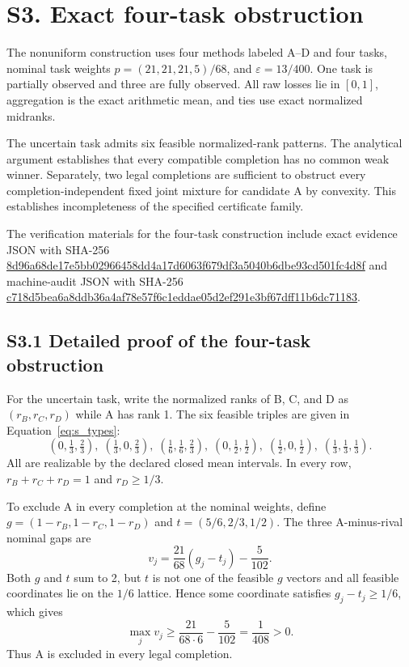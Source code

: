\documentclass[11pt]{article}
\begin{document}
\section*{S3. Exact four-task obstruction}
The nonuniform construction uses four methods labeled A--D and four tasks, nominal task weights $p=(21,21,21,5)/68$, and $\varepsilon=13/400$. One task is partially observed and three are fully observed. All raw losses lie in $[0,1]$, aggregation is the exact arithmetic mean, and ties use exact normalized midranks.

The uncertain task admits six feasible normalized-rank patterns. The analytical argument establishes that every compatible completion has no common weak winner. Separately, two legal completions are sufficient to obstruct every completion-independent fixed joint mixture for candidate A by convexity. This establishes incompleteness of the specified certificate family.

The verification materials for the four-task construction include exact evidence JSON with SHA-256 \url{8d96a68de17e5bb02966458dd4a17d6063f679df3a5040b6dbe93cd501fc4d8f} and machine-audit JSON with SHA-256 \url{c718d5bea6a8ddb36a4af78e57f6c1eddae05d2ef291e3bf67dff11b6dc71183}.

\subsection*{S3.1 Detailed proof of the four-task obstruction}
For the uncertain task, write the normalized ranks of B, C, and D as $(r_B,r_C,r_D)$ while A has rank 1. The six feasible triples are given in Equation~\eqref{eq:s_types}:
\begin{equation}\label{eq:s_types}
(0,\tfrac13,\tfrac23),\;(\tfrac13,0,\tfrac23),\;(\tfrac16,\tfrac16,\tfrac23),\;(0,\tfrac12,\tfrac12),\;(\tfrac12,0,\tfrac12),\;(\tfrac13,\tfrac13,\tfrac13).
\end{equation}
All are realizable by the declared closed mean intervals. In every row, $r_B+r_C+r_D=1$ and $r_D\ge 1/3$.

To exclude A in every completion at the nominal weights, define $g=(1-r_B,1-r_C,1-r_D)$ and $t=(5/6,2/3,1/2)$. The three A-minus-rival nominal gaps are
\begin{equation}\label{eq:s_vj}
v_j=\frac{21}{68}(g_j-t_j)-\frac{5}{102}.
\end{equation}
Both $g$ and $t$ sum to 2, but $t$ is not one of the feasible $g$ vectors and all feasible coordinates lie on the $1/6$ lattice. Hence some coordinate satisfies $g_j-t_j\ge 1/6$, which gives
\begin{equation}\label{eq:s_A_margin}
\max_j v_j\ge \frac{21}{68\cdot6}-\frac{5}{102}=\frac1{408}>0.
\end{equation}
Thus A is excluded in every legal completion.
\end{document}
